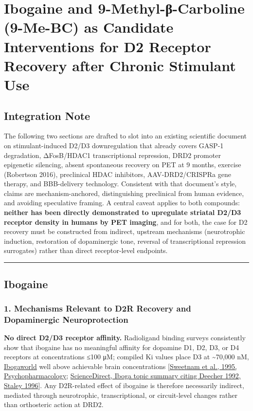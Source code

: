 ﻿\section{Ibogaine and 9-Methyl-β-Carboline (9-Me-BC) as Candidate Interventions for D2 Receptor Recovery after Chronic Stimulant Use}\label{20_ibogaine-ibogaine-and-9-methyl-ux3b2-carboline-9-me-bc-as-candidate-interventions-for-d2-receptor-recovery-after-chronic-stimulant-use}

\subsection{Integration Note}\label{20_ibogaine-integration-note}

The following two sections are drafted to slot into an existing scientific document on stimulant-induced D2/D3 downregulation that already covers GASP-1 degradation, ΔFosB/HDAC1 transcriptional repression, DRD2 promoter epigenetic silencing, absent spontaneous recovery on PET at 9 months, exercise (Robertson 2016), preclinical HDAC inhibitors, AAV-DRD2/CRISPRa gene therapy, and BBB-delivery technology. Consistent with that document's style, claims are mechanism-anchored, distinguishing preclinical from human evidence, and avoiding speculative framing. A central caveat applies to both compounds: \textbf{neither has been directly demonstrated to upregulate striatal D2/D3 receptor density in humans by PET imaging}, and for both, the case for D2 recovery must be constructed from indirect, upstream mechanisms (neurotrophic induction, restoration of dopaminergic tone, reversal of transcriptional repression surrogates) rather than direct receptor-level endpoints.

\begin{center}\rule{0.5\linewidth}{0.5pt}\end{center}

\subsection{Ibogaine}\label{20_ibogaine-ibogaine}

\subsubsection{1. Mechanisms Relevant to D2R Recovery and Dopaminergic Neuroprotection}\label{20_ibogaine-mechanisms-relevant-to-d2r-recovery-and-dopaminergic-neuroprotection}

\textbf{No direct D2/D3 receptor affinity.} Radioligand binding surveys consistently show that ibogaine has no meaningful affinity for dopamine D1, D2, D3, or D4 receptors at concentrations ≤100 μM; compiled Ki values place D3 at \textasciitilde70,000 nM, \href{https://www.ibogaworld.com/ibogainebinding-profile/}{Ibogaworld} well above achievable brain concentrations {[}\href{https://link.springer.com/article/10.1007/BF02245936}{Sweetnam et al., 1995, Psychopharmacology}; \href{https://www.sciencedirect.com/topics/neuroscience/iboga}{ScienceDirect, Iboga topic summary citing Deecher 1992, Staley 1996}{]}. Any D2R-related effect of ibogaine is therefore necessarily indirect, mediated through neurotrophic, transcriptional, or circuit-level changes rather than orthosteric action at DRD2.

